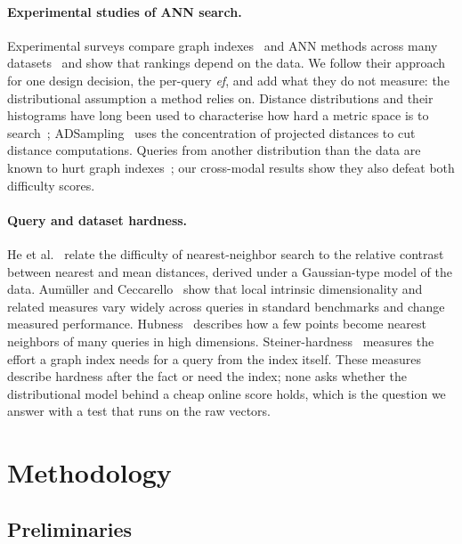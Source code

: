\documentclass[sigconf,review=false,screen]{acmart}
\newcommand{\ef}{\textit{ef}}
\begin{document}
\paragraph{Experimental studies of ANN search.}
Experimental surveys compare graph indexes~\cite{wang2021graphsurvey} and ANN methods across many
datasets~\cite{li2020annexperiments,aumuller2020annbenchmarks} and show that rankings depend on the
data. We follow their approach for one design decision, the per-query \ef{}, and add what they do not
measure: the distributional assumption a method relies on. Distance distributions and their
histograms have long been used to characterise how hard a metric space is to search~\cite{chavez2001metric};
ADSampling~\cite{gao2023adsampling} uses the concentration of projected distances to cut distance
computations. Queries from another distribution than the data are known to hurt graph
indexes~\cite{jaiswal2022ooddiskann,chen2024roargraph}; our cross-modal results show they also defeat
both difficulty scores.

\paragraph{Query and dataset hardness.}
He et al.~\cite{he2012difficulty} relate the difficulty of nearest-neighbor search to the relative
contrast between nearest and mean distances, derived under a Gaussian-type model of the data.
Aum\"uller and Ceccarello~\cite{aumuller2019lid} show that local intrinsic dimensionality and
related measures vary widely across queries in standard benchmarks and change measured performance.
Hubness~\cite{radovanovic2010hubs} describes how a few points become nearest neighbors of many
queries in high dimensions. Steiner-hardness~\cite{wang2024steiner} measures the effort a graph
index needs for a query from the index itself. These measures describe hardness after the fact or
need the index; none asks whether the distributional model behind a cheap online score holds, which
is the question we answer with a test that runs on the raw vectors.

\section{Methodology}

\subsection{Preliminaries}
\end{document}
